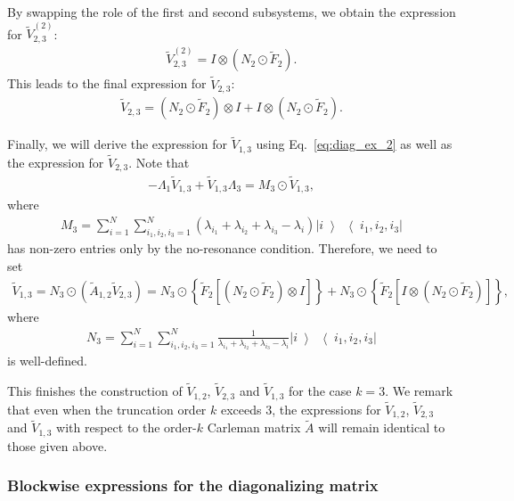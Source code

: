 \documentclass[superscriptaddress,onecolumn,nofootinbib,longbibliography,a4paper,accepted=2026-09-29]{quantumarticle}
\theoremstyle{plain}
\theoremstyle{definition}
\numberwithin{thm}{section}
\numberwithin{assumption}{section}
\numberwithin{lemma}{section}
\numberwithin{prop}{section}
\numberwithin{cor}{section}
\numberwithin{definition}{section}
\numberwithin{rmk}{section}
\numberwithin{equation}{section}
\newcommand{\ketbra}[2]   {\left|#1\middle\rangle\!\middle\langle#2\right|}
\newcommand{\lrb}[1]{\left ( #1 \right )}
\newcommand{\lrsb}[1]{\left [ #1 \right ]}
\newcommand{\lrcb}[1]{\left \{ #1 \right \}}
\begin{document}
By swapping the role of the first and second subsystems, we obtain the expression for $\tilde{V}_{2,3}^{(2)}$:
\begin{align}
\tilde{V}_{2,3}^{(2)} = I \otimes (N_2 \odot \tilde{F}_2).
\end{align}
This leads to the final expression for $\tilde{V}_{2,3}$:
\begin{align}
\tilde{V}_{2,3}=  (N_2 \odot \tilde{F}_2) \otimes I +  I \otimes (N_2 \odot \tilde{F}_2). 
\end{align}

Finally, we will derive the expression for $\tilde{V}_{1,3}$ using Eq.~\eqref{eq:diag_ex_2} as well as the expression for $\tilde{V}_{2,3}$. Note that
\begin{align}
-\Lambda_1 \tilde{V}_{1,3} + \tilde{V}_{1,3} \Lambda_3 = M_3 \odot \tilde{V}_{1,3},
\end{align}
where 
\begin{align}
M_3=\sum_{i=1}^N \sum_{i_1,i_2,i_3=1}^N \lrb{\lambda_{i_1}+\lambda_{i_2}+\lambda_{i_3}-\lambda_{i}} \ketbra{i}{i_1,i_2,i_3}
\end{align}
has non-zero entries only by the no-resonance condition. Therefore, we need to set
\begin{align}
\tilde{V}_{1,3}=N_3 \odot (\tilde{A}_{1,2}\tilde{V}_{2,3})
= N_3 \odot \lrcb{\tilde{F}_2 \lrsb{\lrb{N_2 \odot \tilde{F}_2} \otimes I}}
+ N_3 \odot \lrcb{\tilde{F}_2 \lrsb{I \otimes \lrb{N_2 \odot \tilde{F}_2}}},
\end{align}
where
\begin{align}
N_3=\sum_{i=1}^N \sum_{i_1,i_2,i_3=1}^N \frac{1}{\lambda_{i_1}+\lambda_{i_2}+\lambda_{i_3}-\lambda_{i}} \ketbra{i}{i_1,i_2,i_3}
\end{align}
is well-defined.

This finishes the construction of $\tilde{V}_{1,2}$, $\tilde{V}_{2,3}$ and $\tilde{V}_{1,3}$ for the case $k=3$. We remark that even when the truncation order $k$ exceeds $3$, the expressions for $\tilde{V}_{1,2}$, $\tilde{V}_{2,3}$ and $\tilde{V}_{1,3}$ with respect to the order-$k$ Carleman matrix $\tilde{A}$ will remain identical to those given above.


\subsubsection{Blockwise expressions for the diagonalizing matrix}
\label{subsec:expression_for_vij_diagonal_f1}
\end{document}

